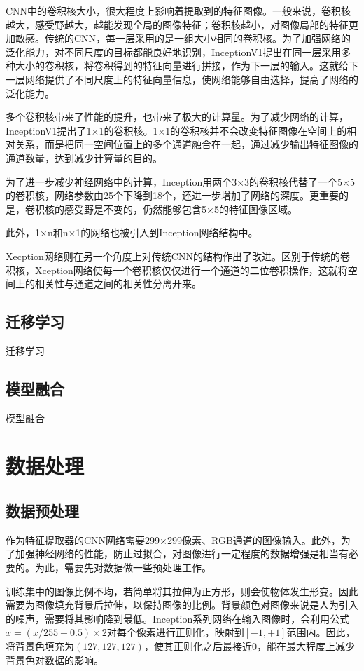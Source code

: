 \documentclass[10.5pt,twocolumn]{jbuaa}
\begin{document}
CNN中的卷积核大小，很大程度上影响着提取到的特征图像。一般来说，卷积核越大，感受野越大，越能发现全局的图像特征；卷积核越小，对图像局部的特征更加敏感。传统的CNN，每一层采用的是一组大小相同的卷积核。为了加强网络的泛化能力，对不同尺度的目标都能良好地识别，InceptionV1提出在同一层采用多种大小的卷积核，将卷积得到的特征向量进行拼接，作为下一层的输入。这就给下一层网络提供了不同尺度上的特征向量信息，使网络能够自由选择，提高了网络的泛化能力。

多个卷积核带来了性能的提升，也带来了极大的计算量。为了减少网络的计算，InceptionV1提出了1×1的卷积核。1×1的卷积核并不会改变特征图像在空间上的相对关系，而是把同一空间位置上的多个通道融合在一起，通过减少输出特征图像的通道数量，达到减少计算量的目的。

为了进一步减少神经网络中的计算，Inception用两个3×3的卷积核代替了一个5×5的卷积核，网络参数由25个下降到18个，还进一步增加了网络的深度。更重要的是，卷积核的感受野是不变的，仍然能够包含5×5的特征图像区域。

此外，1×n和n×1的网络也被引入到Inception网络结构中。

Xecption网络则在另一个角度上对传统CNN的结构作出了改进。区别于传统的卷积核，Xception网络使每一个卷积核仅仅进行一个通道的二位卷积操作，这就将空间上的相关性与通道之间的相关性分离开来。
\subsection{迁移学习}
迁移学习

\subsection{模型融合}
模型融合

\section{数据处理}
\subsection{数据预处理}
作为特征提取器的CNN网络需要299×299像素、RGB通道的图像输入。此外，为了加强神经网络的性能，防止过拟合，对图像进行一定程度的数据增强是相当有必要的。为此，需要先对数据做一些预处理工作。

训练集中的图像比例不均，若简单将其拉伸为正方形，则会使物体发生形变。因此需要为图像填充背景后拉伸，以保持图像的比例。背景颜色对图像来说是人为引入的噪声，需要将其影响降到最低。Inception系列网络在输入图像时，会利用公式$x=(x/255-0.5)\times2$对每个像素进行正则化，映射到$[-1,+1]$范围内。因此，将背景色填充为$(127,127,127)$，使其正则化之后最接近0，能在最大程度上减少背景色对数据的影响。
\end{document}
